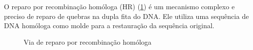 \documentclass[11pt,a4paper]{article}
\begin{document}
	O reparo por recombinação homóloga (HR) (\ref{fig:recombinacaoHomologa}) é um mecanismo complexo e preciso de reparo de quebras na dupla fita do DNA. Ele utiliza uma sequência de DNA homóloga como molde para a restauração da sequência original.

	\begin{figure}
		\centering
		\caption{Via de reparo por recombinação homóloga}
		\label{fig:recombinacaoHomologa}
	\end{figure}
\end{document}
